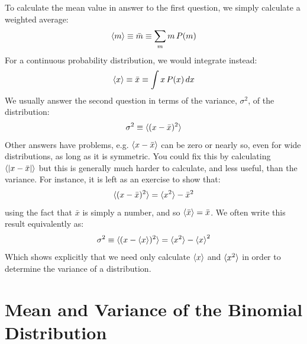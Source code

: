 \documentclass[12pt,oneside]{book}
\begin{document}
To calculate the mean value in answer to the first question, we simply calculate a weighted average:
\begin{equation}
\braket{m} \equiv \bar{m} \equiv \sum_m m \, P(m) 
\end{equation}
For a continuous probability distribution, we would integrate instead:
\begin{equation}
\braket{x} \equiv \bar{x} \equiv \int x \, P(x) \, dx 
\end{equation}
We usually answer the second question in terms of the variance, $\sigma^2$, of the distribution:
\begin{displaymath}
\sigma^2 \equiv \braket{(x-\bar{x})^2}
\end{displaymath}
Other answers have problems, e.g. $\braket{x-\bar{x}}$ can be zero or nearly so, even for wide distributions, as long as it is symmetric.  You could fix this by calculating $\braket{|x-\bar{x}|}$ but this is generally much harder to calculate, and less useful, than the variance.  For instance, it is left as an exercise to show that:
\begin{equation}
\label{eqn:varhw}
\braket{(x-\bar{x})^2} = \braket{x^2} -\bar{x}^2
\end{equation}
using the fact that $\bar{x}$ is simply a number, and so $\braket{\bar{x}} = \bar{x}$.  We often write this result equivalently as:
\begin{equation}
\label{eqn:variance}
\sigma^2 \equiv \braket{(x-\braket{x})^2} = \braket{x^2} - \braket{x}^2
\end{equation}
Which shows explicitly that we need only calculate $\braket{x}$ and $\braket{x^2}$ in order to determine the variance of a distribution.

\section{Mean and Variance of the Binomial Distribution}
\end{document}
